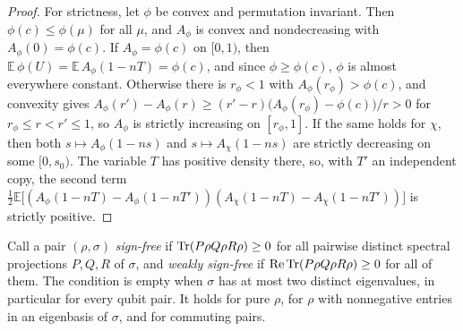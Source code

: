 \begin{proof}
For strictness, let $\phi$ be convex and permutation invariant. Then $\phi(c)\le\phi(\mu)$ for all $\mu$, and $A_\phi$ is convex and nondecreasing with $A_\phi(0)=\phi(c)$. If $A_\phi=\phi(c)$ on $[0,1)$, then $\mathbb E\,\phi(U)=\mathbb E\,A_\phi(1-nT)=\phi(c)$, and since $\phi\ge\phi(c)$, $\phi$ is almost everywhere constant. Otherwise there is $r_\phi<1$ with $A_\phi(r_\phi)>\phi(c)$, and convexity gives $A_\phi(r')-A_\phi(r)\ge(r'-r)\big(A_\phi(r_\phi)-\phi(c)\big)/r>0$ for $r_\phi\le r<r'\le1$, so $A_\phi$ is strictly increasing on $[r_\phi,1]$. If the same holds for $\chi$, then both $s\mapsto A_\phi(1-ns)$ and $s\mapsto A_\chi(1-ns)$ are strictly decreasing on some $[0,s_0)$. The variable $T$ has positive density there, so, with $T'$ an independent copy, the second term $\frac12\mathbb E\big[(A_\phi(1-nT)-A_\phi(1-nT'))(A_\chi(1-nT)-A_\chi(1-nT'))\big]$ is strictly positive.
\end{proof}

Call a pair $(\rho,\sigma)$ \emph{sign-free} if $\operatorname{Tr}(P\rho Q\rho R\rho)\ge0$ for all pairwise distinct spectral projections $P,Q,R$ of $\sigma$, and \emph{weakly sign-free} if $\mathrm{Re}\operatorname{Tr}(P\rho Q\rho R\rho)\ge0$ for all of them. The condition is empty when $\sigma$ has at most two distinct eigenvalues, in particular for every qubit pair. It holds for pure $\rho$, for $\rho$ with nonnegative entries in an eigenbasis of $\sigma$, and for commuting pairs.

